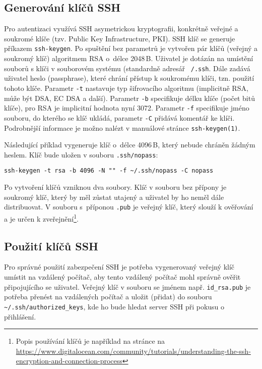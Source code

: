 \subsection{Generování klíčů SSH}
Pro autentizaci využívá SSH asymetrickou kryptografii, konkrétně veřejné a soukromé klíče (tzv. Public Key Infrastructure, PKI). 
SSH klíč se generuje příkazem {\tt ssh-keygen}. Po spuštění bez parametrů je vytvořen pár klíčů (veřejný a soukromý klíč) algoritmem RSA o~délce 2048\,B. Uživatel je dotázán na umístění souborů s klíči v souborovém systému (standardně adresář {\tt ~/.ssh}. Dále zadává uživatel heslo (passphrase), které chrání přístup k soukromému klíči, tzn. použití tohoto klíče. Parametr {\tt -t} nastavuje typ šifrovacího algoritmu (implicitně RSA, může být DSA, EC DSA a další). Parametr {\tt -b} specifikuje délku klíče (počet bitů klíče), pro RSA je implicitní hodnota nyní 3072. Parametr {\tt -f} specifikuje jméno souboru, do kterého se klíč ukládá, parametr {\tt -C} přidává komentář ke klíči. Podrobnější informace je možno nalézt v  manuálové stránce {\tt ssh-keygen(1)}.

Následující příklad vygeneruje klíč o~délce 4096\,B, který nebude chráněn žádným heslem. Klíč bude uložen v souboru {\tt .ssh/nopass}:
\begin{verbatim}
ssh-keygen -t rsa -b 4096 -N "" -f ~/.ssh/nopass -C nopass
\end{verbatim}

Po vytvoření klíčů vzniknou dva soubory. Klíč v souboru bez přípony je soukromý klíč, který by měl zůstat utajený a uživatel by ho neměl dále distribuovat. V souboru s~příponou {\tt .pub} je veřejný klíč, který slouží k ověřování a je určen k zveřejnění\footnote{Popis používání klíčů je například na stránce na \url{https://www.digitalocean.com/community/tutorials/understanding-the-ssh-encryption-and-connection-process}}.

\subsection{Použití klíčů SSH}
Pro správné použití zabezpečení SSH je potřeba vygenerovaný veřejný klíč umístit na vzdálený počítač, aby tento vzdálený počítač mohl správně ověřit připojujícího se uživatel. Veřejný klíč v souboru se jménem např.  {\tt id\_rsa.pub} je potřeba přenést na vzdálených počítač a uložit (přidat) do souboru \verb| ~/.ssh/authorized_keys|, kde ho bude hledat server SSH při pokusu o přihlášení.

